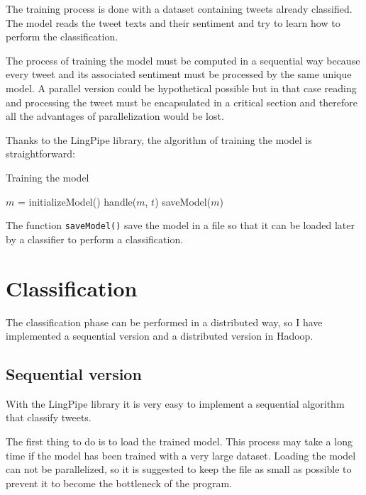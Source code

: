 \documentclass[10pt,twocolumn,letterpaper]{article}
\begin{document}
The training process is done with a dataset containing tweets already classified. The model reads the tweet texts and their sentiment and try to learn how to perform the classification.

The process of training the model must be computed in a sequential way because every tweet and its associated sentiment must be processed by the same unique model. A parallel version could be hypothetical possible but in that case reading and processing the tweet must be encapsulated in a critical section and therefore all the advantages of parallelization would be lost.

Thanks to the LingPipe library, the algorithm of training the model is straightforward:

\begin{algorithm}[H]
\label{TrainingAlgorithm}
\caption{Training the model}
\begin{algorithmic}

    \State $m$ = initializeModel()
        \State handle($m$, $t$)
    \EndFor
    \State saveModel($m$)

\end{algorithmic}
\end{algorithm}

The function \verb"saveModel()" save the model in a file so that it can be loaded later by a classifier to perform a classification.

\section{Classification}

The classification phase can be performed in a distributed way, so I have implemented a sequential version and a distributed version in Hadoop.

\subsection{Sequential version}

With the LingPipe library it is very easy to implement a sequential algorithm that classify tweets.

The first thing to do is to load the trained model. This process may take a long time if the model has been trained with a very large dataset. Loading the model can not be parallelized, so it is suggested to keep the file as small as possible to prevent it to become the bottleneck of the program.
\end{document}
